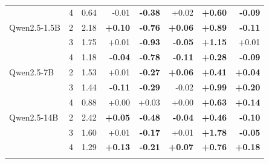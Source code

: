 \begin{tabular}{lrrrrrrr}
 & 4 & 0.64 & -0.01 & \textbf{-0.38} & +0.02 & \textbf{+0.60} & \textbf{-0.09} \\
\addlinespace[2pt]
Qwen2.5-1.5B & 2 & 2.18 & \textbf{+0.10} & \textbf{-0.76} & \textbf{+0.06} & \textbf{+0.89} & \textbf{-0.11} \\
 & 3 & 1.75 & +0.01 & \textbf{-0.93} & \textbf{-0.05} & \textbf{+1.15} & +0.01 \\
 & 4 & 1.18 & \textbf{-0.04} & \textbf{-0.78} & \textbf{-0.11} & \textbf{+0.28} & \textbf{-0.09} \\
\addlinespace[2pt]
Qwen2.5-7B & 2 & 1.53 & +0.01 & \textbf{-0.27} & \textbf{+0.06} & \textbf{+0.41} & \textbf{+0.04} \\
 & 3 & 1.44 & \textbf{-0.11} & \textbf{-0.29} & -0.02 & \textbf{+0.99} & \textbf{+0.20} \\
 & 4 & 0.88 & +0.00 & +0.03 & +0.00 & \textbf{+0.63} & \textbf{+0.14} \\
\addlinespace[2pt]
Qwen2.5-14B & 2 & 2.42 & \textbf{+0.05} & \textbf{-0.48} & \textbf{-0.04} & \textbf{+0.46} & \textbf{-0.10} \\
 & 3 & 1.60 & +0.01 & \textbf{-0.17} & +0.01 & \textbf{+1.78} & \textbf{-0.05} \\
 & 4 & 1.29 & \textbf{+0.13} & \textbf{-0.21} & \textbf{+0.07} & \textbf{+0.76} & \textbf{+0.18} \\
\addlinespace[2pt]
\bottomrule
\end{tabular}
